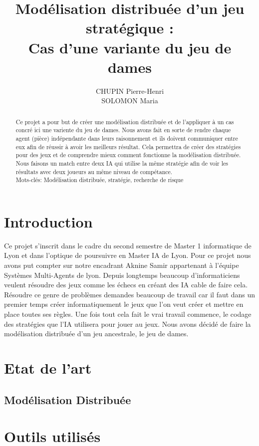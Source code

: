 \documentclass[11pt]{article} %
\title{Modélisation distribuée d’un jeu stratégique : 
 \\ Cas d'une variante du jeu de dames}
\author{CHUPIN Pierre-Henri \\ SOLOMON Maria}
\date{} %
\begin{document}
\maketitle

\begin{abstract}
Ce  projet  a  pour  but  de  créer  une modélisation distribuée et de l'appliquer à un cas concré ici une variente du jeu de dames. Nous avons fait en sorte de rendre chaque agent (pièce) indépendante dans leurs raisonnement et ils doivent communiquer entre eux afin de réussir à avoir les meilleurs résultat. Cela permettra de créer des stratégies pour des jeux et de comprendre mieux comment fonctionne la modélisation distribuée. Nous faisons un match entre deux IA qui utilise la même stratégie afin de voir les résultats avec deux joueurs au même niveau de compétance. \\
Mots-clés: Modélisation distribuée, stratégie, recherche de risque
\end{abstract}
\section{Introduction}
Ce projet s'inscrit dans le cadre du second semestre de Master 1 informatique de Lyon et dans l'optique de poursuivre en Master IA de Lyon. Pour ce projet nous avons put compter sur notre encadrant Aknine Samir appartenant à l'équipe Systèmes Multi-Agents de lyon. Depuis longtemps beaucoup d'informaticiens veulent résoudre des jeux comme les échecs en créant des IA cable de faire cela. Résoudre ce genre de problèmes demandes beaucoup de travail car il faut dans un premier temps créer informatiquement le jeux que l’on veut créer et mettre en place toutes ses règles. Une fois tout cela fait le vrai travail commence, le codage des stratégies que l’IA utilisera pour jouer au jeux. Nous avons décidé de faire la modélisation distribuée d'un jeu ancestrale, le jeu de dames. 

\section{Etat de l'art}

\subsection{Modélisation Distribuée}

\section{Outils utilisés}
\end{document}
